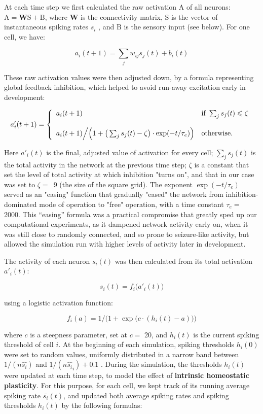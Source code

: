 \documentclass{article}
\begin{document}
At each time step we first calculated the raw activation $\mathrm{A}$ of all neurons: $\mathrm{A} = \mathbf{W}\mathrm{S} + \mathrm{B}$, where $\mathbf{W}$ is the connectivity matrix, $\mathrm{S}$ is the vector of instantaneous spiking rates $s_i$ , and $\mathrm{B}$ is the sensory input (see below). For one cell, we have:

\[ a_i(t+1) = \sum_j{w_{ij}s_j(t)} + b_i(t) \]

These raw activation values were then adjusted down, by a formula representing global feedback inhibition, which helped to avoid run-away excitation early in development:

\[ a'_i(t+1) = \left \{ \begin{array}{l l} a_i(t+1)
& \text{if } \sum_j{s_j(t)} \leqslant \zeta \\ 
 & \\
a_i(t+1)\Big/ \Big(1 + \big(\sum_j{s_j(t)} - \zeta\big) \cdot \exp(- t/\tau_e)\Big) 
& \text{otherwise.} \end{array} \right. \]

Here $a'_i(t)$ is the final, adjusted value of activation for every cell; $\sum_j{s_j(t)}$ is the total activity in the network at the previous time step; $\zeta$ is a constant that set the level of total activity at which inhibition "turns on", and that in our case was set to \mbox{$\zeta=$ 9} (the size of the square grid). The exponent $\exp(-t/\tau_e)$ served as an "easing" function that gradually "eased" the network from inhibition-dominated mode of operation to "free" operation, with a time constant $\tau_e=$ 2000. This “easing” formula was a practical compromise that greatly sped up our computational experiments, as it dampened network activity early on, when it was still close to randomly connected, and so prone to seizure-like activity, but allowed the simulation run with higher levels of activity later in development.

The activity of each neuron $s_i(t)$ was then calculated from its total activation $a'_i(t)$:

\[ s_i(t) = f_i\big(a'_i(t)\big) \]

using a logistic activation function: 

\[ f_i(a) = 1/\Big(1+\exp\big(c\cdot(h_i(t)-a)\big)\Big) \]

where $c$ is a steepness parameter, set at $c=$ 20, and $h_i(t)$ is the current spiking threshold of cell $i$. At the beginning of each simulation, spiking thresholds $h_i(0)$ were set to random values, uniformly distributed in a narrow band between $1/(n \hat{s_i})$ and $1/(n \hat{s_i}_i)+0.1$ . During the simulation, the thresholds $h_i(t)$ were updated at each time step, to model the effect of \textbf{intrinsic homeostatic plasticity}. For this purpose, for each cell, we kept track of its running average spiking rate $\bar{s_i}(t)$, and updated both average spiking rates and spiking thresholds $h_i(t)$ by the following formulas:
\end{document}
